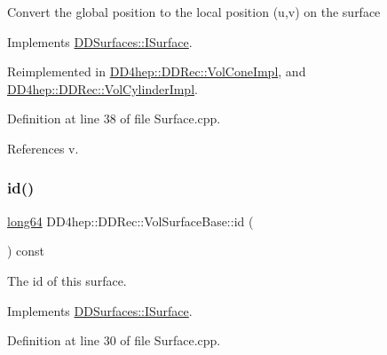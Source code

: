 Convert the global position to the local position (u,v) on the surface 

Implements \hyperlink{class_d_d_surfaces_1_1_i_surface_a0d6db86d4871584a9e72ac6018229737}{D\+D\+Surfaces\+::\+I\+Surface}.



Reimplemented in \hyperlink{class_d_d4hep_1_1_d_d_rec_1_1_vol_cone_impl_ae45867d32eb1958d209f1e1670620976}{D\+D4hep\+::\+D\+D\+Rec\+::\+Vol\+Cone\+Impl}, and \hyperlink{class_d_d4hep_1_1_d_d_rec_1_1_vol_cylinder_impl_a5bcd55a843e711dff3e03eb3e14887bd}{D\+D4hep\+::\+D\+D\+Rec\+::\+Vol\+Cylinder\+Impl}.



Definition at line 38 of file Surface.\+cpp.



References v.

\hypertarget{class_d_d4hep_1_1_d_d_rec_1_1_vol_surface_base_a7b86431da7ec970cde28adfeade28427}{}\label{class_d_d4hep_1_1_d_d_rec_1_1_vol_surface_base_a7b86431da7ec970cde28adfeade28427} 
\subsubsection{\texorpdfstring{id()}{id()}}
{\footnotesize\ttfamily \hyperlink{namespace_d_d_surfaces_ab6b3da366f31f80aec56447ac4442e78}{long64} D\+D4hep\+::\+D\+D\+Rec\+::\+Vol\+Surface\+Base\+::id (\begin{DoxyParamCaption}{ }\end{DoxyParamCaption}) const\hspace{0.3cm}{\ttfamily [virtual]}}



The id of this surface. 



Implements \hyperlink{class_d_d_surfaces_1_1_i_surface_aaf7bf967d4a0652c620ec9754a2b37c1}{D\+D\+Surfaces\+::\+I\+Surface}.



Definition at line 30 of file Surface.\+cpp.

\hypertarget{class_d_d4hep_1_1_d_d_rec_1_1_vol_surface_base_ab963afedcbd258aa996223abe1e065bb}{}\label{class_d_d4hep_1_1_d_d_rec_1_1_vol_surface_base_ab963afedcbd258aa996223abe1e065bb} 
